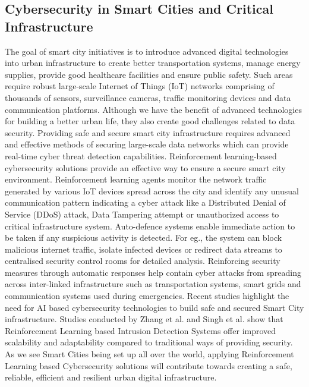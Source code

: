 \documentclass[12pt]{article}
\begin{document}
\subsection{Cybersecurity in Smart Cities and Critical Infrastructure}
The goal of smart city initiatives is to introduce advanced digital technologies into urban infrastructure to create better transportation systems, manage energy supplies, provide good healthcare facilities and ensure public safety. Such areas require robust large-scale Internet of Things (IoT) networks comprising of thousands of sensors, surveillance cameras, traffic monitoring devices and data communication platforms. Although we have the benefit of advanced technologies for building a better urban life, they also create good challenges related to data security. Providing safe and secure smart city infrastructure requires advanced and effective methods of securing large-scale data networks which can provide real-time cyber threat detection capabilities. 
Reinforcement learning-based cybersecurity solutions provide an effective way to ensure a secure smart city environment. Reinforcement learning agents monitor the network traffic generated by various IoT devices spread across the city and identify any unusual communication pattern indicating a cyber attack like a Distributed Denial of Service (DDoS) attack, Data Tampering attempt or unauthorized access to critical infrastructure system. 
Auto-defence systems enable immediate action to be taken if any suspicious activity is detected. For eg., the system can block malicious internet traffic, isolate infected devices or redirect data streams to centralised security control rooms for detailed analysis. Reinforcing security measures through automatic responses help contain cyber attacks from spreading across inter-linked infrastructure such as transportation systems, smart grids and communication systems used during emergencies. 
Recent studies highlight the need for AI based cybersecurity technologies to build safe and secured Smart City infrastructure. Studies conducted by Zhang et al. and Singh et al. show that Reinforcement Learning based Intrusion Detection Systems offer improved scalability and adaptability compared to traditional ways of providing security. As we see Smart Cities being set up all over the world, applying Reinforcement Learning based Cybersecurity solutions will contribute towards creating a safe, reliable, efficient and resilient urban digital infrastructure.\cite{Zhang2024, Singh2024, Patel2024, Gupta2024, Sharma2023}
	
\end{document}
